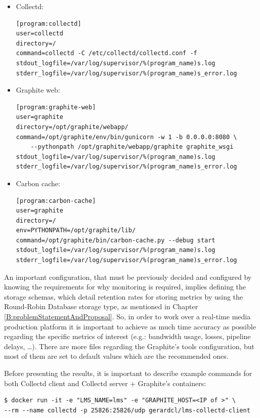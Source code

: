 \begin{itemize}
\item Collectd: \hfill

\begin{verbatim}
[program:collectd]
user=collectd
directory=/
command=collectd -C /etc/collectd/collectd.conf -f
stdout_logfile=/var/log/supervisor/%(program_name)s.log
stderr_logfile=/var/log/supervisor/%(program_name)s_error.log
\end{verbatim}
\item Graphite web: \hfill

\begin{verbatim}
[program:graphite-web]
user=graphite
directory=/opt/graphite/webapp/
command=/opt/graphite/env/bin/gunicorn -w 1 -b 0.0.0.0:8080 \
	--pythonpath /opt/graphite/webapp/graphite graphite_wsgi
stdout_logfile=/var/log/supervisor/%(program_name)s.log
stderr_logfile=/var/log/supervisor/%(program_name)s_error.log
\end{verbatim}

\item Carbon cache: \hfill

\begin{verbatim}
[program:carbon-cache]
user=graphite
directory=/
env=PYTHONPATH=/opt/graphite/lib/
command=/opt/graphite/bin/carbon-cache.py --debug start
stdout_logfile=/var/log/supervisor/%(program_name)s.log
stderr_logfile=/var/log/supervisor/%(program_name)s_error.log
\end{verbatim}
\end{itemize}

An important configuration, that must be previously decided and configured by knowing the requirements for why monitoring is required, implies defining the storage schemas, which detail retention rates for storing metrics by using the Round-Robin Database storage type, as mentioned in Chapter \ref{B:problemStatementAndProposal}. So, in order to work over a real-time media production platform it is important to achieve as much time accuracy as possible regarding the specific metrics of interest (e.g.: bandwidth usage, losses, pipeline delays, \ldots). There are more files regarding the Graphite's tools configuration, but most of them are set to default values which are the recommended ones. 

Before presenting the results, it is important to describe example commands for both Collectd client and Collectd server + Graphite's containers:

\begin{verbatim}
$ docker run -it -e "LMS_NAME=lms" -e "GRAPHITE_HOST=<IP of >" \
--rm --name collectd -p 25826:25826/udp gerardcl/lms-collectd-client
\end{verbatim}

